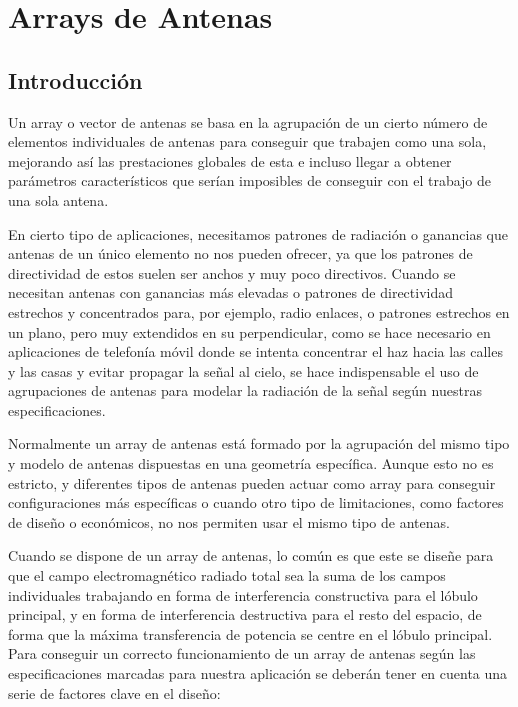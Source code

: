
\chapter{Arrays de Antenas}
\label{arraysdeantenas}

\section{Introducción}

\par Un array o vector de antenas se basa en la agrupación de un cierto número de elementos individuales de antenas para conseguir que trabajen como una sola, mejorando así las prestaciones globales de esta e incluso llegar a obtener parámetros característicos que serían imposibles de conseguir con el trabajo de una sola antena.

\par En cierto tipo de aplicaciones, necesitamos patrones de radiación o ganancias que antenas de un único elemento no nos pueden ofrecer, ya que los patrones de directividad de estos suelen ser anchos y muy poco directivos. Cuando se necesitan antenas con ganancias más elevadas o patrones de directividad estrechos y concentrados para, por ejemplo, radio enlaces, o patrones estrechos en un plano, pero muy extendidos en su perpendicular, como se hace necesario en aplicaciones de telefonía móvil donde se intenta concentrar el haz hacia las calles y las casas y evitar propagar la señal al cielo, se hace indispensable el uso de agrupaciones de antenas para modelar la radiación de la señal según nuestras especificaciones.
\\
\par Normalmente un array de antenas está formado por la agrupación del mismo tipo y modelo de antenas dispuestas en una geometría específica. Aunque esto no es estricto, y diferentes tipos de antenas pueden actuar como array para conseguir configuraciones más específicas o cuando otro tipo de limitaciones, como factores de diseño o económicos, no nos permiten usar el mismo tipo de antenas.
\\
\par Cuando se dispone de un array de antenas, lo común es que este se diseñe para que el campo electromagnético radiado total sea la suma de los campos individuales trabajando en forma de interferencia constructiva para el lóbulo principal, y en forma de interferencia destructiva para el resto del espacio, de forma que la máxima transferencia de potencia se centre en el lóbulo principal. Para conseguir un correcto funcionamiento de un array de antenas según las especificaciones marcadas para nuestra aplicación se deberán tener en cuenta una serie de factores clave en el diseño:

